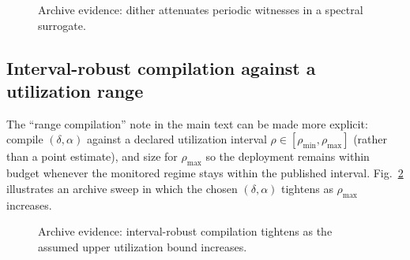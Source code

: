 \documentclass[11pt]{article}
\theoremstyle{definition}
\theoremstyle{remark}
\begin{document}
\begin{figure}[t]
\centering
{}
\caption{Archive evidence: dither attenuates periodic witnesses in a spectral surrogate.}
\label{fig:spectral}
\end{figure}

\subsection{Interval-robust compilation against a utilization range}
The ``range compilation'' note in the main text can be made more explicit:
compile $(\delta,\alpha)$ against a declared utilization interval $\rho\in[\rho_{\min},\rho_{\max}]$ (rather than a point estimate),
and size for $\rho_{\max}$ so the deployment remains within budget whenever the monitored regime stays within the published interval.
Fig.~\ref{fig:utilrangeopt} illustrates an archive sweep in which the chosen $(\delta,\alpha)$ tightens as $\rho_{\max}$ increases.

\begin{figure}[t]
\centering
{}
\caption{Archive evidence: interval-robust compilation tightens as the assumed upper utilization bound increases.}
\label{fig:utilrangeopt}
\end{figure}
\end{document}
